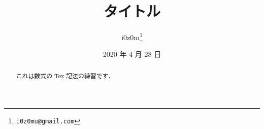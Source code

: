 \documentclass[uplatex]{jsarticle}
\begin{document}
\title{タイトル}
\author{i0z0m\thanks{\texttt{i0z0mu@gmail.com}}}
\date{2020 年 4 月 28 日}
\maketitle

\begin{abstract}
これは数式の Tex 記法の練習です．\cite{y.}
\end{abstract}
\printbibliography
\end{document}
